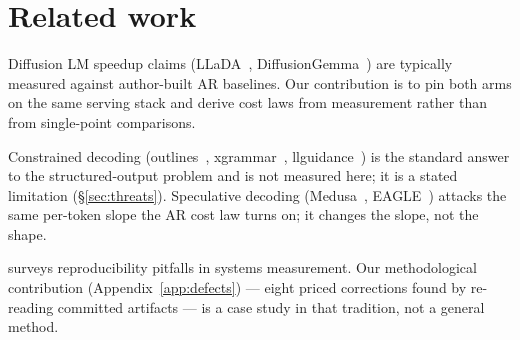 \section{Related work}
\label{sec:related}

Diffusion LM speedup claims (LLaDA~\cite{llada2025},
DiffusionGemma~\cite{diffusiongemma}) are typically measured against
author-built AR baselines. Our contribution is to pin both arms on the
same serving stack and derive cost laws from measurement rather than
from single-point comparisons.

Constrained decoding (outlines~\cite{outlines2024},
xgrammar~\cite{xgrammar2024}, llguidance~\cite{llguidance}) is the
standard answer to the structured-output problem and is not measured
here; it is a stated limitation (\S\ref{sec:threats}). Speculative
decoding (Medusa~\cite{medusa2024}, EAGLE~\cite{eagle2024}) attacks the
same per-token slope the AR cost law turns on; it changes the slope, not
the shape.

\cite{hoefler2021} surveys reproducibility pitfalls in systems
measurement. Our methodological contribution (Appendix~\ref{app:defects})
--- eight priced corrections found by re-reading committed artifacts ---
is a case study in that tradition, not a general method.
